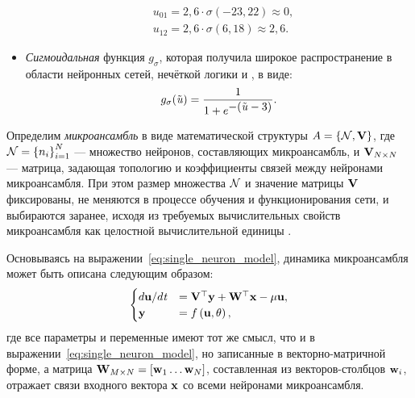 \begin{itemize}
\begin{align*}
            &u_{01} = 2,6 \cdot \sigma\left(-23,22\right) \approx 0, \\
            &u_{12} = 2,6 \cdot \sigma\left(6,18\right) \approx 2,6.
        \end{align*}
	\item \textit{Сигмоидальная} функция $g_{\sigma}$, которая получила широкое распространение в области нейронных сетей, нечёткой логики и \other, в виде:
		\begin{equation}
            \label{eq:activation_function_sigma}
			g_{\sigma}(\tilde{\mathit{u}}) = \dfrac{1}{1 + e^{\displaystyle -(\tilde{\mathit{u}} - 3)}}.
		\end{equation}
\end{itemize}


\begin{Definition*}
    Определим \textit{микроансамбль} в виде математической структуры $A = \left\{ \mathcal{N}, \mathrm{\mathbf{V}} \right\}$, где $\mathcal{N} = \left\{ n_{i} \right\}_{i=1}^{N} $ --- множество нейронов, составляющих микроансамбль, и $\mathrm{\mathbf{V}}_{N \times N}$ --- матрица, задающая топологию и коэффициенты связей между нейронами микроансамбля. При этом размер множества $\mathcal{N}$ и значение матрицы $\mathrm{\mathbf{V}}$ фиксированы, \ie не меняются в процессе обучения и функционирования сети, и выбираются заранее, исходя из требуемых вычислительных свойств микроансамбля как целостной вычислительной единицы .
\end{Definition*}

Основываясь на выражении~\eqref{eq:single_neuron_model}, динамика микроансамбля может быть описана следующим образом:
\begin{equation}
    \label{eq:microensemble_model}
    \begin{cases}
        d\mathrm{\mathbf{u}}/d\mathit{t} &= \mathrm{\mathbf{V}}^{\top} \mathrm{\mathbf{y}} + \mathrm{\mathbf{W}}^{\top} \mathrm{\mathbf{x}} - \mu \mathrm{\mathbf{u}}, \\
        \mathrm{\mathbf{y}}              &= f\left( \mathrm{\mathbf{u}}, \theta \right), \\
    \end{cases}
\end{equation}
где все параметры и переменные имеют тот же смысл, что и в выражении~\eqref{eq:single_neuron_model}, но записанные в векторно-матричной форме, а матрица $\mathrm{\mathbf{W}}_{M \times N} = \left[ \mathrm{\mathbf{w}}_{1} \ldots \mathrm{\mathbf{w}}_{N} \right]$, составленная из векторов-столбцов $\mathrm{\mathbf{w}}_{i}$, отражает связи входного вектора $\mathrm{\mathbf{x}}$ со всеми нейронами микроансамбля.

